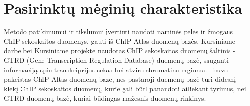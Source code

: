 \documentclass[12pt]{article}
\begin{document}


\newpage


\section{Pasirinktų mėginių charakteristika}
Metodo patikimumui ir tikslumui įvertinti naudoti naminės pelės ir žmogaus
ChIP sekoskaitos duomenys, gauti iš ChIP-Atlas\cite{CHIPATLAS} duomenų bazės.
Kursiniame darbe bei Kursiniame projekte naudotas ChIP sekoskaitos duomenų
šaltinis - GTRD (Gene Transcription Regulation Database)\cite{GTRD} duomenų
bazė, sauganti informaciją apie transkripcijos sekas bei atviro chromatino
regionus - buvo pakeistas ChIP-Altas duomenų baze, nes pastaroji duomenų
bazė turi didesnį kiekį ChIP sekoskaitos duomenų, kurie gali būti panaudoti
atliekant tyrimus, nei GTRD duomenų bazė, kuriai būdingas mažesnis duomenų
rinkinys.
\end{document}
